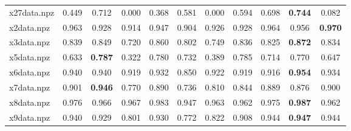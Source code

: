 \documentclass{article}
\begin{document}
\begin{table}[htbp]
\begin{adjustbox}{width=\textwidth}
\begin{tabular}{lcccccccccc}
x27data.npz & 0.449 & 0.712 & 0.000 & 0.368 & 0.581 & 0.000 & 0.594 & 0.698 & \cellcolor{graybg}\textbf{0.744} & 0.082 \\
x2data.npz & 0.963 & 0.928 & 0.914 & 0.947 & 0.904 & 0.926 & 0.928 & 0.964 & 0.956 & \cellcolor{graybg}\textbf{0.970} \\
x3data.npz & 0.839 & 0.849 & 0.720 & 0.860 & 0.802 & 0.749 & 0.836 & 0.825 & \cellcolor{graybg}\textbf{0.872} & 0.834 \\
x5data.npz & 0.633 & \cellcolor{graybg}\textbf{0.787} & 0.322 & 0.780 & 0.732 & 0.389 & 0.785 & 0.714 & 0.770 & 0.647 \\
x6data.npz & 0.940 & 0.940 & 0.919 & 0.932 & 0.850 & 0.922 & 0.919 & 0.916 & \cellcolor{graybg}\textbf{0.954} & 0.934 \\
x7data.npz & 0.901 & \cellcolor{graybg}\textbf{0.946} & 0.770 & 0.890 & 0.736 & 0.810 & 0.844 & 0.889 & 0.876 & 0.900 \\
x8data.npz & 0.976 & 0.966 & 0.967 & 0.983 & 0.947 & 0.963 & 0.962 & 0.975 & \cellcolor{graybg}\textbf{0.987} & 0.962 \\
x9data.npz & 0.940 & 0.929 & 0.801 & 0.930 & 0.772 & 0.822 & 0.908 & 0.944 & \cellcolor{graybg}\textbf{0.947} & 0.944 \\
\hline
\end{tabular}
\end{adjustbox}
\end{table}
\end{document}
